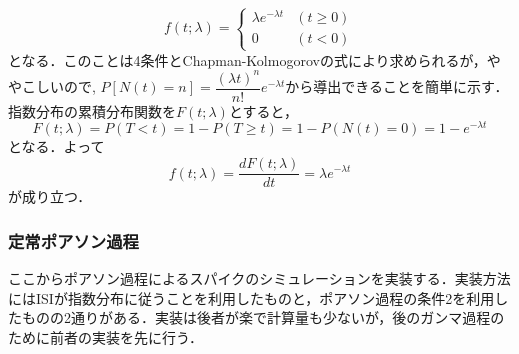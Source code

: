 \begin{equation}
f(t;\lambda )=\left\{{\begin{array}{ll}\lambda e^{-\lambda t}&(t\geq 0)\\0&(t<0)\end{array}}\right.
\end{equation}
となる．このことは4条件とChapman-Kolmogorovの式により求められるが，ややこしいので, $P[N(t)=n]=\dfrac{(\lambda t)^{n}}{n !} e^{-\lambda t}$から導出できることを簡単に示す．指数分布の累積分布関数を$F(t; \lambda)$とすると，
\begin{equation}
F(t; \lambda) = P(T< t)=1-P(T\geq t)=1-P(N(t)=0)=1-e^{-\lambda t}
\end{equation}
となる．よって
\begin{equation}
f(t; \lambda)=\frac{dF(t; \lambda)}{dt}=\lambda e^{-\lambda t}
\end{equation}
が成り立つ．
\subsubsection{定常ポアソン過程}
ここからポアソン過程によるスパイクのシミュレーションを実装する．実装方法にはISIが指数分布に従うことを利用したものと，ポアソン過程の条件2を利用したものの2通りがある．実装は後者が楽で計算量も少ないが，後のガンマ過程のために前者の実装を先に行う．

